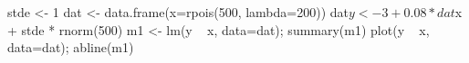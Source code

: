 \begin{Schunk}
\begin{Sinput}
 stde <- 1
 dat <- data.frame(x=rpois(500, lambda=200))
 dat$y <- 3 + 0.08 * dat$x + stde * rnorm(500)
 m1 <- lm(y ~ x, data=dat); summary(m1)
 plot(y ~ x, data=dat); abline(m1)
\end{Sinput}
\end{Schunk}
